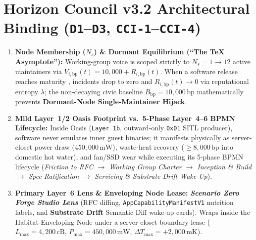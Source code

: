 \section{Horizon Council v3.2 Architectural Binding (\texttt{D1}--\texttt{D3}, \texttt{CCI-1}--\texttt{CCI-4})}
\begin{enumerate}
    \item \textbf{Node Membership ($N_s$) \& Dormant Equilibrium (``The \TeX{} Asymptote''):} Working-group voice is scoped strictly to $N_s = 1 \to 12$ active maintainers via $V_{i,\mathrm{bp}}(t) = 10{,}000 + R_{i,\mathrm{bp}}(t)$. When a software release reaches maturity \parencite{knuth1984tex}, incidents drop to zero and $R_{i,\mathrm{bp}}(t) \to 0$ via reputational entropy $\lambda$; the non-decaying civic baseline $B_{\mathrm{bp}} = 10{,}000\,\mathrm{bp}$ mathematically prevents \textbf{Dormant-Node Single-Maintainer Hijack}.
    \item \textbf{Mild Layer~1/2 Oasis Footprint vs.\ 5-Phase Layer~4--6 BPMN Lifecycle:} Inside Oasis (\texttt{Layer~1b}, outward-only \texttt{0x01} SITL producer), software never emulates inner guest binaries; it manifests physically as server-closet power draw ($450{,}000\,\mathrm{mW}$), waste-heat recovery ($\ge 8{,}000\,\mathrm{bp}$ into domestic hot water), and fan/SSD wear while executing its 5-phase BPMN lifecycle (\textit{Friction to RFC $\to$ Working Group Charter $\to$ Inception \& Build $\to$ Spec Ratification $\to$ Servicing \& Substrate-Drift Wake-Up}).
    \item \textbf{Primary Layer~6 Lens \& Enveloping Node Lease:} \textbf{\textit{Scenario Zero Forge Studio Lens}} (RFC diffing, \texttt{AppCapabilityManifestV1} nutrition labels, and \textbf{Substrate Drift} Semantic Diff wake-up cards). Wraps inside the Habitat Enveloping Node under a server-closet boundary lease ($L_{\max} = 4{,}200\,\mathrm{cB}$, $P_{\max} = 450{,}000\,\mathrm{mW}$, $\Delta T_{\max} = +2{,}000\,\mathrm{mK}$).
\end{enumerate}

